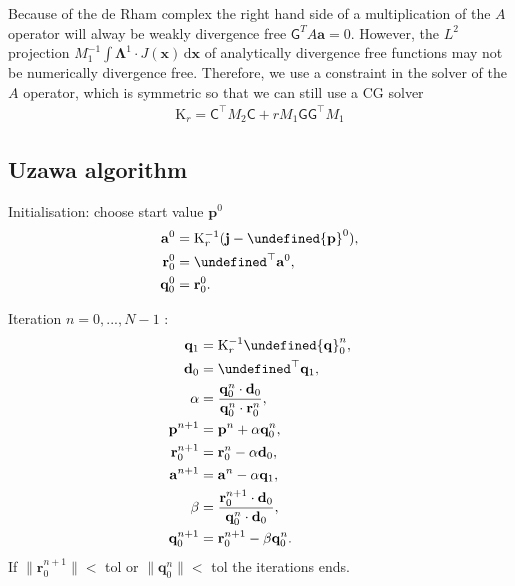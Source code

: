 \documentclass[12pt,a4paper,twoside]{article}
\let\L\undefined
\newcommand{\L}{\mathrm{L}}
\newcommand{\K}{\mathrm{K}}
\newcommand{\du}{\,\mathrm{d}}
\newcommand{\ab}{{\mathbf{a}}}
\newcommand{\xb}{{\mathbf{x}}}
\newcommand{\jb}{{\mathbf{j}}}
\newcommand{\pb}{{\mathbf{p}}}
\newcommand{\qb}{{\mathbf{q}}}
\newcommand{\rb}{{\mathbf{r}}}
\newcommand{\C}{\ensuremath{\mathsf{C}}}
\newcommand{\G}{\ensuremath{\mathsf{G}}}
\newcommand{\Lab}{\ensuremath{\boldsymbol{\Lambda}}}
\newcommand{\db}{\mathbf{d}}
\numberwithin{equation}{section}
\begin{document}
Because of the de Rham complex the right hand side of a multiplication of the $A$ operator will alway be weakly divergence free $\G^T A\ab = 0$. However, the $L^2$ projection $M_1^{-1} \int \Lab^1 \cdot J(\xb) \du \xb$ of analytically divergence free functions may not be numerically divergence free. Therefore, we use a constraint in the solver of the $A$ operator, which is symmetric so that we can still use a CG solver
\begin{align*}
\K_r= \C^\top M_2 \C + r M_1 \G \G^\top M_1 
\end{align*}
\subsection{Uzawa algorithm}
Initialisation: choose start value $\pb^0$
\begin{align*}
\ab^0 &= \K_r^{-1}(\jb-\L \pb^0), \\
\rb_0^0 &= \L^\top \ab^0, \\
\qb_0^0 &= \rb_0^0. 
\end{align*}

Iteration $n=0,..., N-1$ :
\begin{align*}
\qb_1 &= \K_r^{-1} \L \qb_0^n,\\
\db_0 &=\L^\top \qb_1, \\
\alpha &= \frac{\qb_0^n \cdot \db_0 }{\qb_0^n \cdot \rb_0^n}, \\
\pb^{n+1} &= \pb^n + \alpha \qb_0^n, \\
\rb_0^{n+1} &= \rb_0^n - \alpha \db_0, \\
\ab^{n+1} &= \ab^n - \alpha \qb_1, \\
\beta &= \frac{\rb_0^{n+1} \cdot \db_0}{\qb_0^n \cdot \db_0}, \\
\qb_0^{n+1} &= \rb_0^{n+1} - \beta \qb_0^n.
\end{align*}
If $\|\rb_0^{n+1}\| < $ tol or $\|\qb_0^n\| < $ tol  the iterations ends.
\end{document}
